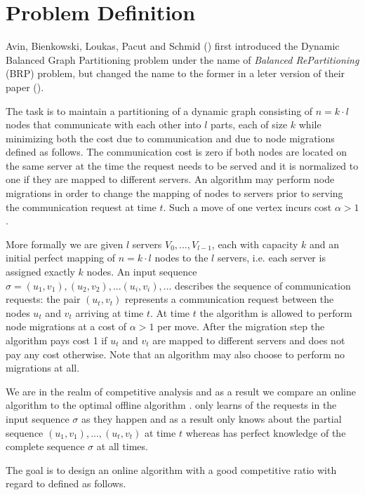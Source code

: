 \documentclass[a4paper,xcolor=dvipsnames, tikz, 12pt]{article}
\newcommand{\opt}{\text{O{\scriptsize PT}}}
\newcommand{\onl}{\text{O{\scriptsize NL}}}
\theoremstyle{definition}
\begin{document}
	
	\section{Problem Definition}
	
	Avin, Bienkowski, Loukas, Pacut and Schmid (\cite{Avin2016}) first introduced the Dynamic Balanced Graph Partitioning problem under the name of \textit{Balanced RePartitioning} (BRP) problem, but changed the name to the former in a leter version of their paper (\cite{Avin2015}).
	
	The task is to maintain a partitioning of a dynamic graph consisting of $n=k\cdot l$ nodes that communicate with each other into $l$ parts, each of size $k$ while minimizing both the cost due to communication and due to node migrations defined as follows. The communication cost is zero if both nodes are located on the same server at the time the request needs to be served and it is normalized to one if they are mapped to different servers. An algorithm may perform node migrations in order to change the mapping of nodes to servers prior to serving the communication request at time $t$. Such a move of one vertex incurs cost $\alpha>1$.
	
	More formally we are given $l$ servers $V_0,...,V_{l-1}$, each with capacity $k$ and an initial perfect mapping of $n=k\cdot l$ nodes to the $l$ servers, i.e. each server is assigned exactly $k$ nodes. An input sequence $\sigma=(u_1, v_1), (u_2, v_2),...(u_i,v_i),...$ describes the sequence of communication requests: the pair $(u_t, v_t)$ represents a communication request between the nodes $u_t$ and $v_t$ arriving at time $t$. At time $t$ the algorithm is allowed to perform node migrations at a cost of $\alpha>1$ per move. After the migration step the algorithm pays cost 1 if $u_t$ and $v_t$ are mapped to different servers and does not pay any cost otherwise. Note that an algorithm may also choose to perform no migrations at all.
	
	We are in the realm of competitive analysis and as a result we compare an online algorithm \onl{} to the optimal offline algorithm \opt{}. \onl{} only learns of the requests in the input sequence $\sigma$ as they happen and as a result only knows about the partial sequence $(u_1,v_1),...,(u_t,v_t)$ at time $t$ whereas \opt{} has perfect knowledge of the complete sequence $\sigma$ at all times.
	
	The goal is to design an online algorithm \onl{} with a good competitive ratio with regard to \opt{} defined as follows.
	
\end{document}
